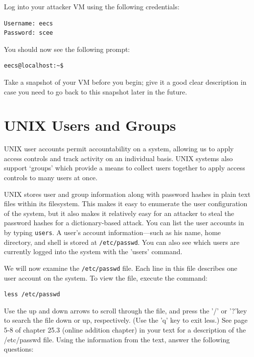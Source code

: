 \documentclass{article}
\begin{document}
Log into your attacker VM using the following credentials:
\begin{verbatim}
Username: eecs
Password: scee
\end{verbatim}

You should now see the following prompt:
\begin{verbatim}
eecs@localhost:~$ 						
\end{verbatim}


Take a snapshot of your VM before you begin; give it a good clear description in case you need to go back to this snapshot later in the future.  

\section{UNIX Users and Groups}

UNIX user accounts permit accountability on a system, allowing us to apply access controls and track activity on an individual basis. UNIX systems also support ‘groups’ which provide a means to collect users together to apply access controls to many users at once. 

UNIX stores user and group information along with password hashes in plain text files within its filesystem. This makes it easy to enumerate the user configuration of the system, but it also makes it relatively easy for an attacker to steal the password hashes for a dictionary-based attack. You can list the user accounts in \ubuntu by typing {\tt users}. A user’s account information—such as his name, home directory, and shell is stored at {\tt/etc/passwd}. You can also see which users are currently logged into the system with the 'users' command.
 
We will now examine the {\tt/etc/passwd} file. Each line in this file describes one user account on the system. To view the file, execute the command:
\begin{verbatim}
less /etc/passwd
\end{verbatim}
Use the up and down arrows to scroll through the file, and press the '/' or '?'key to search the file down or up, respectively. (Use the 'q' key to exit less.)  See page 5-8 of chapter 25.3 (online addition chapter) in your text for a description of the /etc/passwd file. Using the information from the text, answer the following questions:\medskip

\medskip

\medskip
\end{document}
